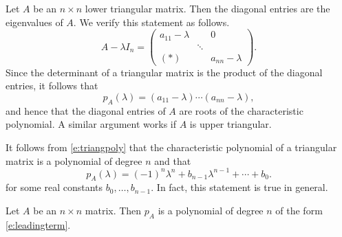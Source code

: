 \documentclass{ximera}
\begin{document}
\begin{example} \label{E:triangular}
Let $A$ be an $n\times n$ lower triangular matrix.  Then the
diagonal entries are the eigenvalues of $A$.  {\rm We verify
this statement as follows.  
\[
A-\lambda I_n = \left(\begin{array}{ccc} a_{11}-\lambda &  & 0 \\
 &  \ddots &  \\ (*) & & a_{nn}-\lambda \end{array}\right).
\]
Since the determinant of a triangular matrix is the product of
the diagonal entries, it follows that 
\begin{equation}  \label{e:triangpoly}
p_A(\lambda) = (a_{11}-\lambda)\cdots(a_{nn}-\lambda),
\end{equation}
and hence that the diagonal entries of $A$ are roots of the 
characteristic polynomial. A similar argument works if $A$ is
upper triangular.}
\end{example}  
 
It follows from \eqref{e:triangpoly} that the characteristic
polynomial of a triangular matrix
is a polynomial of degree $n$ and that
\begin{equation}  \label{e:leadingterm}
p_A(\lambda) = (-1)^n \lambda^n + b_{n-1}\lambda^{n-1} + \cdots +b_0.
\end{equation}
for some real constants $b_0, \ldots, b_{n-1}$. In fact, this
statement is true in general.  

\begin{theorem}  \label{T:charpolyn}
Let $A$ be an $n\times n$ matrix.  Then $p_A$ is a polynomial of
degree $n$ of the form \eqref{e:leadingterm}.
\end{theorem} 
\end{document}
